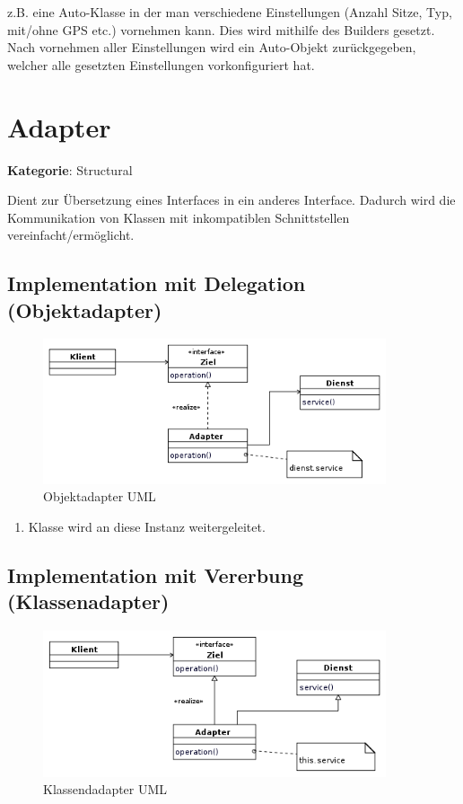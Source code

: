 z.B. eine Auto-Klasse in der man verschiedene Einstellungen (Anzahl Sitze, Typ, mit/ohne GPS etc.) vornehmen kann. Dies wird mithilfe des Builders gesetzt. Nach vornehmen aller Einstellungen wird ein Auto-Objekt zurückgegeben, welcher alle gesetzten Einstellungen vorkonfiguriert hat.

\section{Adapter}
\textbf{Kategorie}: Structural

Dient zur Übersetzung eines Interfaces in ein anderes Interface. Dadurch wird die Kommunikation von Klassen mit inkompatiblen Schnittstellen vereinfacht/ermöglicht.


\subsection*{Implementation mit Delegation (Objektadapter)}

\begin{figure}[H]
	\centering
	\includegraphics[width=0.9\textwidth]{content/gof/images/05-adapter-delegation-uml.png}
	\caption{Objektadapter UML}
\end{figure}


\begin{enumerate}
	\item Klasse wird an diese Instanz weitergeleitet.
\end{enumerate}


\subsection*{Implementation mit Vererbung (Klassenadapter)}

\begin{figure}[H]
	\centering
	\includegraphics[width=0.9\textwidth]{content/gof/images/05-adapter-classes-uml.png}
	\caption{Klassendadapter UML}
\end{figure}


